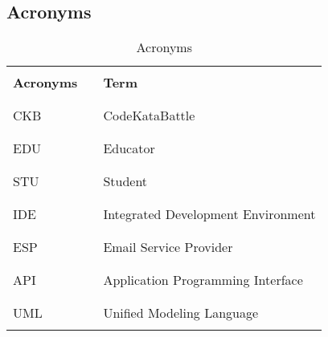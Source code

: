\subsection{Acronyms}
\begin{table}[H]
    \centering
    \renewcommand{\arraystretch}{0.5}
    \begin{tabular}{l l p{11cm}}
        \hline
                          &        &                                    \\
        \textbf{Acronyms} & \vline & \textbf{Term}                      \\
                          &        &                                    \\\hline & & \\
        CKB               & \vline & CodeKataBattle                     \\
                          &        &                                    \\\hline & & \\
        EDU               & \vline & Educator                           \\
                          &        &                                    \\\hline & & \\
        STU               & \vline & Student                            \\
                          &        &                                    \\\hline & & \\
        IDE               & \vline & Integrated Development Environment \\
                          &        &                                    \\\hline & & \\
        ESP               & \vline & Email Service Provider             \\
                          &        &                                    \\\hline & & \\
        API               & \vline & Application Programming Interface  \\
                          &        &                                    \\\hline & & \\
        UML               & \vline & Unified Modeling Language          \\   
                          &        &                                    \\
        \hline
    \end{tabular}
    \caption{Acronyms}
\end{table}

